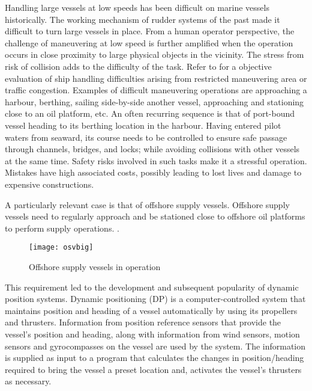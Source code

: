 
Handling large vessels at low speeds has been difficult on marine vessels historically. The working mechanism of rudder systems of the past made it difficult to turn large vessels in place. From a human operator perspective, the challenge of maneuvering at low speed is further amplified when the operation occurs in close proximity to large physical objects in the vicinity. The stress from risk of collision adds to the difficulty of the task. Refer to \citep{inoue2000evaluation} for a objective evaluation of ship handling difficulties arising from restricted maneuvering area or traffic congestion. Examples of difficult maneuvering operations are approaching a harbour, berthing, sailing side-by-side another vessel, approaching and stationing close to an oil platform, etc. An often recurring sequence is that of  port-bound vessel heading to its berthing location in the harbour. Having entered pilot waters from seaward, its course needs to be controlled to ensure safe passage through channels, bridges, and locks; while avoiding collisions with other vessels at the same time. Safety risks involved in such tasks make it a stressful operation. Mistakes have high associated costs, possibly leading to lost lives and damage to expensive constructions.



A particularly relevant case is that of offshore supply vessels. Offshore supply vessels need to regularly approach and be stationed close to offshore oil platforms to perform supply operations. . 

\begin{figure}
	\centering
	\texttt{[image: osvbig]}
	\caption{Offshore supply vessels in operation}
	\label{fig:shipforces}
\end{figure}
This requirement led to the development and subsequent popularity of dynamic position systems. Dynamic positioning (DP) is a computer-controlled system that maintains position and heading of a vessel automatically by using its propellers and thrusters. Information from position reference sensors that provide the vessel’s position and heading, along with information from wind sensors, motion sensors and gyrocompasses on the vessel are used by the system. The information is supplied as input to a program that calculates the changes in position/heading required to bring the vessel a preset location and, activates the vessel’s thrusters as necessary.

